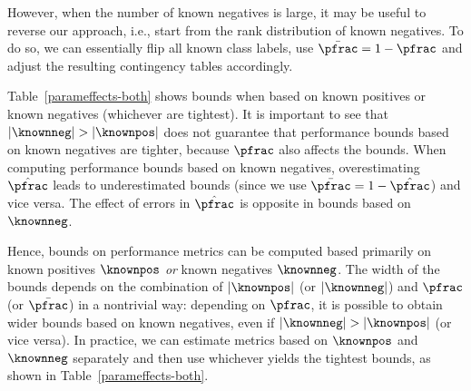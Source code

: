 \newcommand{\plotauclabels}{
\begin{tikzpicture}[baseline=0.8ex]
    \begin{axis}[hide axis,clip=false,
	xmin=0.67,xmax=0.87,xlabel={X},
	ymin=-1,ymax=1,
	x=12cm, y=0.8em,
	]
\node [gray] at (axis cs: 0.67, 0) {$67\%$};
\node [black] at (axis cs: 0.763, 0) {$76.8\%$};
\node [gray] at (axis cs: 0.87, 0) {$87\%$};
\addplot[gray, dotted] coordinates {(0.7068, -1) (0.7068, 1)};
\addplot[gray, dotted] coordinates {(0.8268, -1) (0.8268, 1)};
\addplot[black, dotted] coordinates {(0.8068, -1) (0.8068, 1)};
    \end{axis}
\end{tikzpicture}
}



However, when the number of known negatives is large, it may be useful to reverse our approach, i.e., start from the rank distribution of known negatives. To do so, we can essentially flip all known class labels, use $\bar{\pfrac}=1-\pfrac$ and adjust the resulting contingency tables accordingly.%

Table~\ref{parameffects-both} shows bounds when based on known positives or known negatives (whichever are tightest). It is important to see that $|\knownneg| > |\knownpos|$ does not guarantee that performance bounds based on known negatives are tighter, because $\pfrac$ also affects the bounds. When computing performance bounds based on known negatives, overestimating $\hat{\pfrac}$ leads to underestimated bounds (since we use $\bar{\pfrac}=1-\hat{\pfrac}$) and vice versa. The effect of errors in $\hat{\pfrac}$ is opposite in bounds based on $\knownneg$.

Hence, bounds on performance metrics can be computed based primarily on known positives $\knownpos$ \emph{or} known negatives $\knownneg$. The width of the bounds depends on the combination of $|\knownpos|$ (or $|\knownneg|$) and $\pfrac$ (or $\bar{\pfrac}$) in a nontrivial way: depending on $\pfrac$, it is possible to obtain wider bounds based on known negatives, even if $|\knownneg| > |\knownpos|$ (or vice versa). In practice, we can estimate metrics based on $\knownpos$ and $\knownneg$ separately and then use whichever yields the tightest bounds, as shown in Table~\ref{parameffects-both}.

